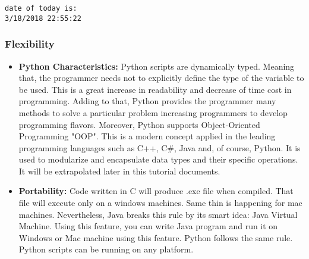 \documentclass[11pt]{article}
\providecommand{\tightlist}{%
      \setlength{\itemsep}{0pt}\setlength{\parskip}{0pt}}
\begin{document}
    \begin{Verbatim}[commandchars=\\\{\}]
date of today is: 
3/18/2018 22:55:22

    \end{Verbatim}

    \subsubsection{Flexibility}\label{flexibility}

    \begin{itemize}
\tightlist
\item
  \textbf{Python Characteristics:} Python scripts are dynamically typed.
  Meaning that, the programmer needs not to explicitly define the type
  of the variable to be used. This is a great increase in readability
  and decrease of time cost in programming. Adding to that, Python
  provides the programmer many methods to solve a particular problem
  increasing programmers to develop programming flavors. Moreover,
  Python supports Object-Oriented Programming "OOP". This is a modern
  concept applied in the leading programming languages such as C++, C\#,
  Java and, of course, Python. It is used to modularize and encapsulate
  data types and their specific operations. It will be extrapolated
  later in this tutorial documents.
\end{itemize}

    \begin{itemize}
\tightlist
\item
  \textbf{Portability:} Code written in C will produce .exe file when
  compiled. That file will execute only on a windows machines. Same thin
  is happening for mac machines. Nevertheless, Java breaks this rule by
  its smart idea: Java Virtual Machine. Using this feature, you can
  write Java program and run it on Windows or Mac machine using this
  feature. Python follows the same rule. Python scripts can be running
  on any platform.
\end{itemize}
\end{document}
